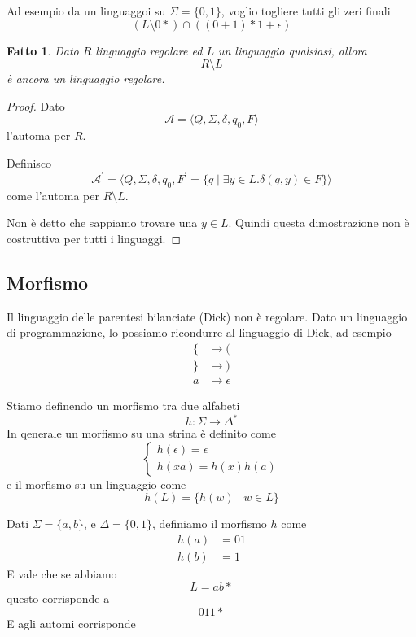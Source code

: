 \documentclass[12pt]{article}
\newtheorem{fatto}{Fatto}
\begin{document}
\begin{tcolorbox}
	Ad esempio da un linguaggoi su $\Sigma = \{0, 1\}$, voglio togliere tutti gli zeri finali
	$$(L \setminus 0*) \cap ((0 + 1)*1 + \epsilon)$$
\end{tcolorbox}
\begin{fatto}
	Dato $R$ linguaggio regolare ed $L$ un linguaggio qualsiasi, allora
	$$ R \setminus L $$
	è ancora un linguaggio regolare.
\end{fatto}
\begin{proof}
	Dato
	$$ \mathcal{A} = \langle Q, \Sigma, \delta, q_0, F \rangle $$
	l'automa per $R$.

	Definisco 
	$$ \mathcal{A}^\prime = \langle Q, \Sigma, \delta, q_0, F^\prime = \{ q \mid \exists y \in L . \delta(q, y) \in F \} \rangle $$
	come l'automa per $R \setminus L$.

	Non è detto che sappiamo trovare una $y \in L$.
	Quindi questa dimostrazione non è costruttiva per tutti i linguaggi.
\end{proof}

\subsection{Morfismo}
Il linguaggio delle parentesi bilanciate (Dick) non è regolare.
Dato un linguaggio di programmazione, lo possiamo ricondurre al linguaggio di Dick, ad esempio
\begin{align*}
	\{ &\rightarrow ( \\
	\} &\rightarrow ) \\
	a  &\rightarrow \epsilon 
\end{align*}

Stiamo definendo un morfismo tra due alfabeti
$$ h : \Sigma \rightarrow \Delta^* $$
In qenerale un morfismo su una strina è definito come
$$
\begin{cases}
	h(\epsilon) = \epsilon \\
	h(xa) = h(x) h(a) 
\end{cases}
$$
e il morfismo su un linguaggio come
$$ h(L) = \{ h(w) \mid w \in L \} $$

\begin{tcolorbox}
	Dati $\Sigma = \{a, b \}$, e $\Delta = \{0, 1\}$, definiamo il morfismo $h$ come
	\begin{align*}
		h(a) &= 01 \\
		h(b) &= 1 
	\end{align*}
	E vale che se abbiamo
	$$ L = a b*$$
	questo corrisponde a
	$$ 011* $$
	E agli automi corrisponde
\end{tcolorbox}
\end{document}
